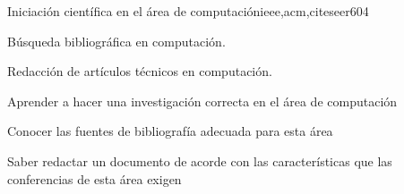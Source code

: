 \begin{syllabus}
\begin{unit}{Iniciación científica en el área de computación}{ieee,acm,citeseer}{60}{4}
  \begin{topics}
      \item Búsqueda bibliográfica en computación.
      \item Redacción de artículos técnicos en computación.
  \end{topics}
  \begin{unitgoals}
      \item Aprender a hacer una investigación correcta en el área de computación
      \item Conocer las fuentes de bibliografía adecuada para esta área
      \item Saber redactar un documento de acorde con las características que las conferencias de esta área exigen
  \end{unitgoals}
\end{unit}

\begin{comment}
algunos comentarios locos \abchfs
\end{comment}



\begin{coursebibliography}
\end{coursebibliography}

\end{syllabus}
